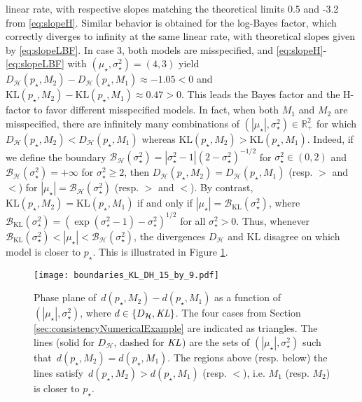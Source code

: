 \documentclass[12pt]{article}
\theoremstyle{plain}
\theoremstyle{definition}
\begin{document}
	linear rate, with respective slopes matching the theoretical limits 0.5 and
	-3.2 from \eqref{eq:slopeH}. Similar behavior is obtained for the
	log-Bayes factor, which correctly diverges to infinity at the same linear rate,
	with theoretical slopes given by \eqref{eq:slopeLBF}. In case 3, both
	models are misspecified, and \eqref{eq:slopeH}-\eqref{eq:slopeLBF} with
	$(\mu_\star,\sigma_\star^2)=(4,3)$ yield
	$D_\mathcal{H}(p_\star,M_2)-D_\mathcal{H}(p_\star,M_1)\approx -1.05<0$ and
	$\text{KL}(p_\star,M_2)-\text{KL}(p_\star,M_1)\approx 0.47>0$. This leads the
	Bayes factor and the H-factor to favor different misspecified models. 
	In fact, when both $M_1$ and $M_2$ are misspecified, there are infinitely many combinations of $(|\mu_\star|,\sigma_\star^2)\in\mathbb{R}_+^2$ for which $D_\mathcal{H}(p_\star,M_2)<D_\mathcal{H}(p_\star,M_1)$ whereas $\text{KL}(p_\star,M_2)>\text{KL}(p_\star,M_1)$. 
	Indeed, if we define the boundary  $\mathcal{B}_\mathcal{H}(\sigma_\star^2) = |\sigma_\star^2-1|({2-\sigma_\star^2})^{-1/2}$ for $\sigma_\star^2\in(0,2)$ and $\mathcal{B}_\mathcal{H}(\sigma_\star^2) = +\infty$ for $\sigma_\star^2\geq 2$, then $D_\mathcal{H}(p_\star,M_2)=D_\mathcal{H}(p_\star,M_1)$ (resp.\! $>$ and $<$) for $|\mu_\star|=\mathcal{B}_\mathcal{H}(\sigma_\star^2)$ (resp.\! $>$ and $<$). By contrast,  $\text{KL}(p_\star,M_2)=\text{KL}(p_\star,M_1)$ if and only if $|\mu_\star|=\mathcal{B}_\text{KL}(\sigma_\star^2)$, where  $\mathcal{B}_\text{KL}(\sigma_\star^2) = ({\exp\left(\sigma_\star^2-1\right)-\sigma_\star^2})^{1/2}$ for all $\sigma_\star^2>0$. Thus, whenever $\mathcal{B}_\text{KL}(\sigma_\star^2)<|\mu_\star|<\mathcal{B}_\mathcal{H}(\sigma_\star^2)$, the divergences $D_\mathcal{H}$ and $\text{KL}$ disagree on which model is closer to $p_\star$. 
	This is illustrated in Figure \ref{fig:iidNormal_boundaries}. 
	\begin{figure}[!h]
		\texttt{[image: boundaries\_KL\_DH\_15\_by\_9.pdf]}
		\centering
		\caption{Phase plane of $\,d(p_\star,M_2) - d(p_\star,M_1)$ as a function of $(|\mu_\star|,\sigma_\star^2)$, where $d\in\{D_\mathcal{H},\emph{\text{KL}}\}$. The four cases from Section \ref{sec:consistencyNumericalExample} are indicated as triangles. The lines (solid for $D_\mathcal{H}$, dashed for $\emph{\text{KL}}$) are the sets of $(|\mu_\star|,\sigma_\star^2)$ such that $\,d(p_\star,M_2) = d(p_\star,M_1)$. The regions above (resp.\! below) the lines satisfy $\,d(p_\star,M_2) > d(p_\star,M_1)$ (resp.\! $<$), i.e. $M_1$ (resp.\! $M_2$) is closer to $p_\star$.}
		\label{fig:iidNormal_boundaries}
	\end{figure}
\end{document}
